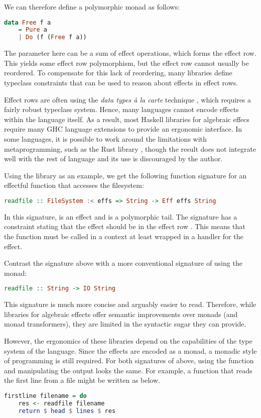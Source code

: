 We can therefore define a polymorphic  monad as follows:
\begin{lstlisting}[language=haskell]
data Free f a
    = Pure a
    | Do (f (Free f a))
\end{lstlisting}
The parameter  here can be a sum of effect operations, which forms the effect row. This yields some effect row polymorphism, but the effect row cannot usually be reordered. To compensate for this lack of reordering, many libraries define typeclass constraints that can be used to reason about effects in effect rows.

Effect rows are often using the \emph{data types à la carte} technique \autocite{swierstra_data_2008}, which requires a fairly robust typeclass system. Hence, many languages cannot encode effects within the language itself. As a result, most Haskell libraries for algebraic effecs require many GHC language extensions to provide an ergonomic interface. In some languages, it is possible to work around the limitations with metaprogramming, such as the Rust library , though the result does not integrate well with the rest of language and its use is discouraged by the author.

Using the  library as an example, we get the following function signature for an effectful function that accesses the filesystem:
\begin{lstlisting}[language=Haskell,style=fancy]
readfile :: FileSystem :< effs => String -> Eff effs String
\end{lstlisting}
In this signature,  is an effect and  is a polymorphic tail. The signature has a constraint stating that the  effect should be in the effect row . This means that the  function must be called in a context at least wrapped in a handler for the  effect.

Contrast the signature above with a more conventional signature of  using the  monad:
\begin{lstlisting}[language=Haskell,style=fancy]
readfile :: String -> IO String
\end{lstlisting}
This signature is much more concise and arguably easier to read. Therefore, while libraries for algebraic effects offer semantic improvements over monads (and monad transformers), they are limited in the syntactic sugar they can provide.

However, the ergonomics of these libraries depend on the capabilities of the type system of the language.   Since the effects are encoded as a monad, a monadic style of programming is still required. For both signatures of  above, using the function and manipulating the output looks the same. For example, a function that reads the first line from a file might be written as below.
\begin{lstlisting}[language=Haskell,style=fancy,mathescape=false]
firstline filename = do
    res <- readfile filename
    return $ head $ lines $ res    
\end{lstlisting}


